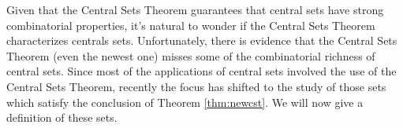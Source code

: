 \documentclass[12pt]{article}
\theoremstyle{plain}
\theoremstyle{definition}
\begin{document}
Given that the Central Sets Theorem guarantees that central sets have
strong combinatorial properties, it's natural to wonder if the Central
Sets Theorem characterizes centrals sets. 
Unfortunately, there is evidence that the Central Sets Theorem (even
the newest one) misses some of the combinatorial richness of central
sets.%
Since most of the applications of central sets involved the use of the
Central Sets Theorem, recently the focus has shifted to the study of
those sets which satisfy the conclusion of Theorem \ref{thm:newcst}. 
We will now give a definition of these sets.
\end{document}
